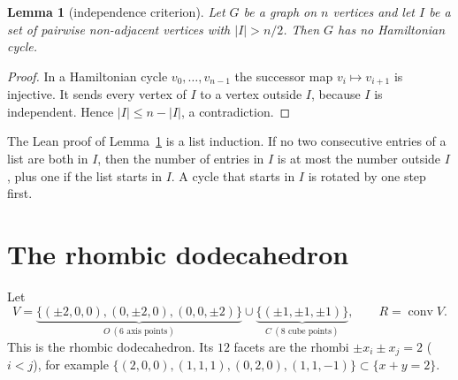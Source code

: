 \documentclass[11pt]{article}
\newtheorem{lemma}[theorem]{Lemma}
\theoremstyle{definition}
\theoremstyle{remark}
\begin{document}
\begin{lemma}[independence criterion]\label{lem:indep}
Let $G$ be a graph on $n$ vertices and let $I$ be a set of pairwise non-adjacent
vertices with $|I|>n/2$. Then $G$ has no Hamiltonian cycle.
\end{lemma}
\begin{proof}
In a Hamiltonian cycle $v_0,\dots,v_{n-1}$ the successor map
$v_i\mapsto v_{i+1}$ is injective. It sends every vertex of $I$ to a vertex
outside $I$, because $I$ is independent. Hence $|I|\le n-|I|$, a contradiction.
\end{proof}
The Lean proof of Lemma~\ref{lem:indep} is a list induction. If no two consecutive
entries of a list are both in $I$, then the number of entries in $I$ is at most
the number outside $I$, plus one if the list starts in $I$. A cycle that starts in
$I$ is rotated by one step first.

\section{The rhombic dodecahedron}
Let
\[V=\underbrace{\{(\pm2,0,0),(0,\pm2,0),(0,0,\pm2)\}}_{O\ (6\text{ axis points})}
\cup\underbrace{\{(\pm1,\pm1,\pm1)\}}_{C\ (8\text{ cube points})},\qquad
R=\operatorname{conv}V.\]
This is the rhombic dodecahedron. Its $12$ facets are the rhombi
$\pm x_i\pm x_j=2$ ($i<j$), for example
$\{(2,0,0),(1,1,1),(0,2,0),(1,1,-1)\}\subset\{x+y=2\}$.
\end{document}
